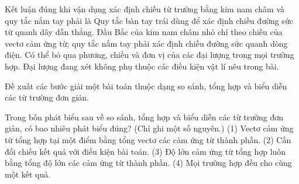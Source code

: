\begin{ex}
Kết luận đúng khi vận dụng xác định chiều từ trường bằng kim nam châm và quy tắc nắm tay phải là
\choice
{Quy tắc bàn tay trái dùng để xác định chiều đường sức từ quanh dây dẫn thẳng.}
{\True Đầu Bắc của kim nam châm nhỏ chỉ theo chiều của vectơ cảm ứng từ; quy tắc nắm tay phải xác định chiều đường sức quanh dòng điện.}
{Có thể bỏ qua phương, chiều và đơn vị của các đại lượng trong mọi trường hợp.}
{Đại lượng đang xét không phụ thuộc các điều kiện vật lí nêu trong bài.}
\end{ex}

\begin{bt}
Đề xuất các bước giải một bài toán thuộc dạng so sánh, tổng hợp và biểu diễn các từ trường đơn giản.
\end{bt}

\begin{ex}
Trong bốn phát biểu sau về so sánh, tổng hợp và biểu diễn các từ trường đơn giản, có bao nhiêu phát biểu đúng? (Chỉ ghi một số nguyên.) (1) Vectơ cảm ứng từ tổng hợp tại một điểm bằng tổng vectơ các cảm ứng từ thành phần. (2) Cần đối chiếu kết quả với điều kiện bài toán. (3) Độ lớn cảm ứng từ tổng hợp luôn bằng tổng độ lớn các cảm ứng từ thành phần. (4) Mọi trường hợp đều cho cùng một kết quả.
\end{ex}

